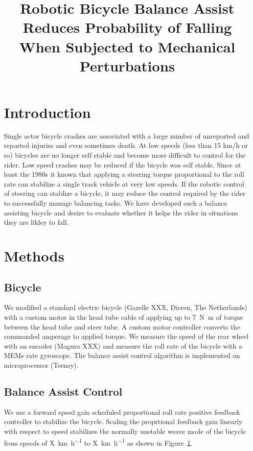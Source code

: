 \documentclass{article}
\title{Robotic Bicycle Balance Assist Reduces Probability of Falling When
Subjected to Mechanical Perturbations}
\begin{document}
\maketitle


\section{Introduction}
%
Single actor bicycle crashes are associated with a large number of unreported
and reported injuries and even sometimes death. At low speeds (less than 15
km/h or so) bicycles are no longer self stable and become more difficult to
control for the rider. Low speed crashes may be reduced if the bicycle was self
stable. Since at least the 1980s it known that applying a steering torque
proportional to the roll rate can stabilize a single track vehicle at very low
speeds. If the robotic control of steering can stablize a bicycle, it may
reduce the control required by the rider to successfully manage balancing
tasks. We have developed such a balance assisting bicycle and desire to
evaluate whether it helps the rider in situations they are likley to fall.

\section{Methods}
%
\subsection{Bicycle}
%
We modified a standard electric bicycle (Gazelle XXX, Dieren, The Netherlands)
with a custom motor in the head tube cable of applying up to
7~\si{\newton\meter} of torque between the head tube and steer tube. A custom
motor controller converts the commanded amperage to applied torque. We measure
the speed of the rear wheel with an encoder (Magura XXX) and measure the roll
rate of the bicycle with a MEMs rate gyroscope. The balance assist control
algorithm is implemented on microprocessor (Teensy).

\subsection{Balance Assist Control}
We use a forward speed gain scheduled proportional roll rate positive feedback
controller to stabilize the bicycle. Scaling the proprtional feedback gain
linearly with respect to speed stabilizes the normally unstable weave mode of
the bicycle from speeds of X~\si{\kilo\meter\per\hour} to
X~\si{\kilo\meter\per\hour} as shown in Figure~\ref{fig:eigenvalues}.
%
\begin{figure}
  \label{fig:eigenvalues}
\end{figure}
\end{document}
